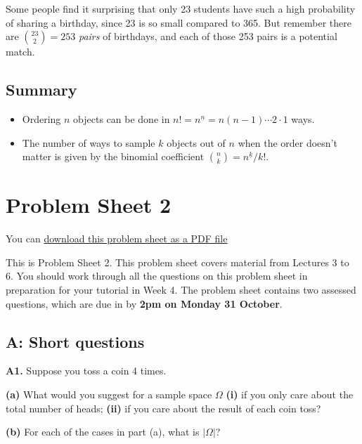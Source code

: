 \documentclass[
  a4paper,
]{book}
\providecommand{\tightlist}{%
  \setlength{\itemsep}{0pt}\setlength{\parskip}{0pt}}
\newif\ifcomm\commtrue
\theoremstyle{definition}
\theoremstyle{definition}
\theoremstyle{definition}
\theoremstyle{definition}
\theoremstyle{remark}
\begin{document}
Some people find it surprising that only 23 students have such a high probability of sharing a birthday, since 23 is so small compared to 365. But remember there are \(\binom{23}{2} = 253\) \emph{pairs} of birthdays, and each of those 253 pairs is a potential match.

\hypertarget{summary-L06}{%
\section*{Summary}\label{summary-L06}}

\begin{itemize}
\tightlist
\item
  Ordering \(n\) objects can be done in \(n! = n^{\underline{n}} = n(n-1)\cdots2\cdot1\) ways.
\item
  The number of ways to sample \(k\) objects out of \(n\) when the order doesn't matter is given by the binomial coefficient \(\binom nk = {n}^{\underline{k}}/k!\).
\end{itemize}

\hypertarget{P2}{%
\chapter*{Problem Sheet 2}\label{P2}}

\commfalse

You can \href{P2-sheet.pdf}{download this problem sheet as a PDF file}

This is Problem Sheet 2. This problem sheet covers material from Lectures 3 to 6. You should work through all the questions on this problem sheet in preparation for your tutorial in Week 4. The problem sheet contains two assessed questions, which are due in by \textbf{2pm on Monday 31 October}.

\hypertarget{P2-short}{%
\section*{A: Short questions}\label{P2-short}}

\textbf{A1.} Suppose you toss a coin 4 times.

\textbf{(a)} What would you suggest for a sample space \(\Omega\) \textbf{(i)} if you only care about the total number of heads; \textbf{(ii)} if you care about the result of each coin toss?

\textbf{(b)} For each of the cases in part (a), what is \(|\Omega|\)?
\end{document}
